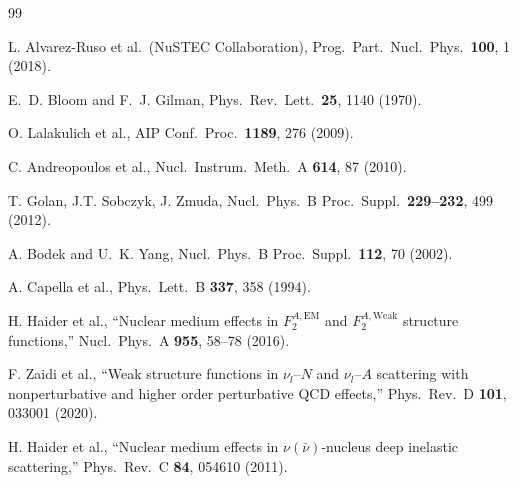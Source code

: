 \documentclass[10pt,twocolumn]{article}
\begin{document}
\begin{thebibliography}{99}
\footnotesize
\setlength{\itemsep}{1.5pt}
\setlength{\parskip}{0pt}

  L. Alvarez-Ruso et al.\ (NuSTEC Collaboration),
  Prog.\ Part.\ Nucl.\ Phys.\ \textbf{100}, 1 (2018).

  E.~D. Bloom and F.~J. Gilman,
  Phys.\ Rev.\ Lett.\ \textbf{25}, 1140 (1970).

  O. Lalakulich et al.,
  AIP Conf.\ Proc.\ \textbf{1189}, 276 (2009).

  C. Andreopoulos et al.,
  Nucl.\ Instrum.\ Meth.\ A \textbf{614}, 87 (2010).

  T. Golan, J.T. Sobczyk, J. Zmuda,
  Nucl.\ Phys.\ B Proc.\ Suppl.\ \textbf{229--232}, 499 (2012).

  A. Bodek and U.~K. Yang,
  Nucl.\ Phys.\ B Proc.\ Suppl.\ \textbf{112}, 70 (2002).

  A. Capella et al.,
  Phys.\ Lett.\ B \textbf{337}, 358 (1994).

  H. Haider et al.,
  ``Nuclear medium effects in $F_2^{A,\mathrm{EM}}$ and
  $F_2^{A,\mathrm{Weak}}$ structure functions,''
  Nucl.\ Phys.\ A \textbf{955}, 58--78 (2016).

  F. Zaidi et al.,
  ``Weak structure functions in $\nu_l$--$N$ and $\nu_l$--$A$ scattering
  with nonperturbative and higher order perturbative QCD effects,''
  Phys.\ Rev.\ D \textbf{101}, 033001 (2020).

  H. Haider et al.,
  ``Nuclear medium effects in $\nu(\bar\nu)$-nucleus deep inelastic scattering,''
  Phys.\ Rev.\ C \textbf{84}, 054610 (2011).


\end{thebibliography}
\end{document}
